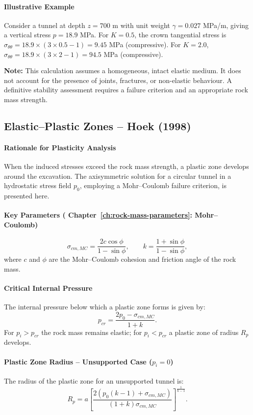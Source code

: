 \paragraph{Illustrative Example}
Consider a tunnel at depth $z = 700$ m with unit weight $\gamma = 0.027$ MPa/m, giving a vertical stress $p = 18.9$ MPa. For $K = 0.5$, the crown tangential stress is $\sigma_{\theta\theta} = 18.9 \times (3 \times 0.5 - 1) = 9.45$ MPa (compressive). For $K = 2.0$, $\sigma_{\theta\theta} = 18.9 \times (3 \times 2 - 1) = 94.5$ MPa (compressive).

\textbf{Note:} This calculation assumes a homogeneous, intact elastic medium. It does not account for the presence of joints, fractures, or non-elastic behaviour. A definitive stability assessment requires a failure criterion and an appropriate rock mass strength.

\subsection{Elastic--Plastic Zones -- Hoek (1998)}

\paragraph{Rationale for Plasticity Analysis}
When the induced stresses exceed the rock mass strength, a plastic zone develops around the excavation. The axisymmetric solution for a circular tunnel in a hydrostatic stress field $p_0$, employing a Mohr--Coulomb failure criterion, is presented here.

\paragraph{Key Parameters ( Chapter~\ref{ch:rock-mass-parameters}: Mohr--Coulomb)}
\[
\sigma_{cm,MC} = \frac{2c\cos\phi}{1-\sin\phi}, \qquad
k = \frac{1+\sin\phi}{1-\sin\phi},
\]
where $c$ and $\phi$ are the Mohr--Coulomb cohesion and friction angle of the rock mass.

\paragraph{Critical Internal Pressure}
The internal pressure below which a plastic zone forms is given by:
\[
p_{cr} = \frac{2p_0 - \sigma_{cm,MC}}{1 + k}.
\]
For $p_i > p_{cr}$ the rock mass remains elastic; for $p_i < p_{cr}$ a plastic zone of radius $R_p$ develops.

\paragraph{Plastic Zone Radius -- Unsupported Case ($p_i = 0$)}
The radius of the plastic zone for an unsupported tunnel is:
\[
R_p = a \left[ \frac{2\left(p_0(k - 1) + \sigma_{cm,MC}\right)}{(1 + k)\sigma_{cm,MC}} \right]^{\frac{1}{k-1}}.
\]


